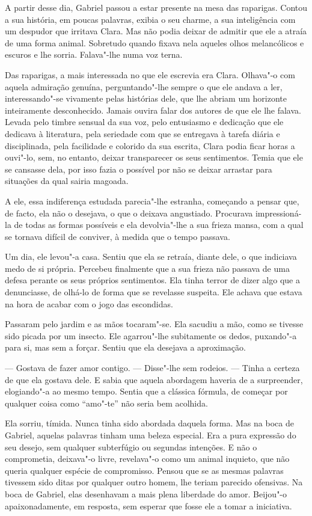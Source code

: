 A partir desse dia, Gabriel passou a estar presente na mesa das
raparigas. Contou a sua história, em poucas palavras, exibia o seu
charme, a sua inteligência com um despudor que irritava Clara. Mas não
podia deixar de admitir que ele a atraía de uma forma animal. Sobretudo
quando fixava nela aqueles olhos melancólicos e escuros e lhe sorria.
Falava"-lhe numa voz terna.

Das raparigas, a mais interessada no que ele escrevia era Clara.
Olhava"-o com aquela admiração genuína, perguntando"-lhe sempre o que ele
andava a ler, interessando"-se vivamente pelas histórias dele, que lhe
abriam um horizonte inteiramente desconhecido. Jamais ouvira falar dos
autores de que ele lhe falava. Levada pelo timbre sensual da sua voz,
pelo entusiasmo e dedicação que ele dedicava à literatura, pela
seriedade com que se entregava à tarefa diária e disciplinada, pela
facilidade e colorido da sua escrita, Clara podia ficar horas a ouvi"-lo,
sem, no entanto, deixar transparecer os seus sentimentos. Temia que ele
se cansasse dela, por isso fazia o possível por não se deixar arrastar
para situações da qual sairia magoada.

A ele, essa indiferença estudada parecia"-lhe estranha, começando a
pensar que, de facto, ela não o desejava, o que o deixava angustiado.
Procurava impressioná-la de todas as formas possíveis e ela devolvia"-lhe
a sua frieza mansa, com a qual se tornava difícil de conviver, à medida
que o tempo passava.

Um dia, ele levou"-a casa. Sentiu que ela se retraía, diante dele, o que
indiciava medo de si própria. Percebeu finalmente que a sua frieza não
passava de uma defesa perante os seus próprios sentimentos. Ela tinha
terror de dizer algo que a denunciasse, de olhá-lo de forma que se
revelasse suspeita. Ele achava que estava na hora de acabar com o jogo
das escondidas.

Passaram pelo jardim e as mãos tocaram"-se. Ela sacudiu a mão, como se
tivesse sido picada por um insecto. Ele agarrou"-lhe subitamente os
dedos, puxando"-a para si, mas sem a forçar. Sentiu que ela desejava a
aproximação.

--- Gostava de fazer amor contigo. --- Disse"-lhe sem rodeios. --- Tinha a
certeza de que ela gostava dele. E sabia que aquela abordagem haveria de
a surpreender, elogiando"-a ao mesmo tempo. Sentia que a clássica
fórmula, de começar por qualquer coisa como ``amo"-te'' não seria bem
acolhida.

Ela sorriu, tímida. Nunca tinha sido abordada daquela forma. Mas na boca
de Gabriel, aquelas palavras tinham uma beleza especial. Era a pura
expressão do seu desejo, sem qualquer subterfúgio ou segundas intenções.
E não o comprometia, deixava"-o livre, revelava"-o como um animal
inquieto, que não queria qualquer espécie de compromisso. Pensou que se
as mesmas palavras tivessem sido ditas por qualquer outro homem, lhe
teriam parecido ofensivas. Na boca de Gabriel, elas desenhavam a mais
plena liberdade do amor. Beijou"-o apaixonadamente, em resposta, sem
esperar que fosse ele a tomar a iniciativa.

